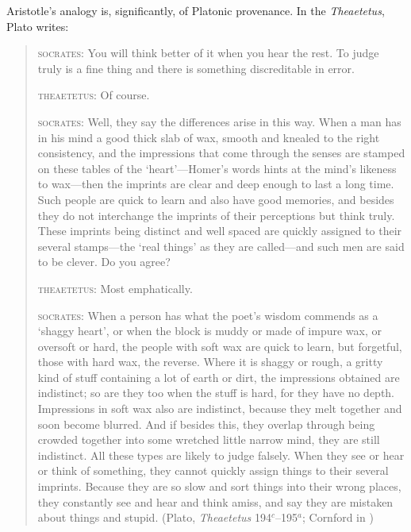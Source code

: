 Aristotle's analogy is, significantly, of Platonic provenance. In the \emph{Theaetetus}, Plato writes:
\begin{quotation}
	\textsc{socrates}: You will think better of it when you hear the rest. To judge truly is a fine thing and there is something discreditable in error.
	
	\textsc{theaetetus}: Of course.
	
	\textsc{socrates}: Well, they say the differences arise in this way. When a man has in his mind a good thick slab of wax, smooth and knealed to the right consistency, and the impressions that come through the senses are stamped on these tables of the `heart'---Homer's words hints at the mind's likeness to wax---then the imprints are clear and deep enough to last a long time. Such people are quick to learn and also have good memories, and besides they do not interchange the imprints of their perceptions but think truly. These imprints being distinct and well spaced are quickly assigned to their several stamps---the `real things' as they are called---and such men are said to be clever. Do you agree?
	
	\textsc{theaetetus}: Most emphatically.
	
	\textsc{socrates}: When a person has what the poet's wisdom commends as a `shaggy heart', or when the block is muddy or made of impure wax, or oversoft or hard, the people with soft wax are quick to learn, but forgetful, those with hard wax, the reverse. Where it is shaggy or rough, a gritty kind of stuff containing a lot of earth or dirt, the impressions obtained are indistinct; so are they too when the stuff is hard, for they have no depth. Impressions in soft wax also are indistinct, because they melt together and soon become blurred. And if besides this, they overlap through being crowded together into some wretched little narrow mind, they are still indistinct. All these types are likely to judge falsely. When they see or hear or think of something, they cannot quickly assign things to their several imprints. Because they are so slow and sort things into their wrong places, they constantly see and hear and think amiss, and say they are mistaken about things and stupid. (Plato, \emph{Theaetetus} 194\( ^{c} \)--195\( ^{a} \); Cornford in \citealt{Hamilton:1989fk})
\end{quotation}

